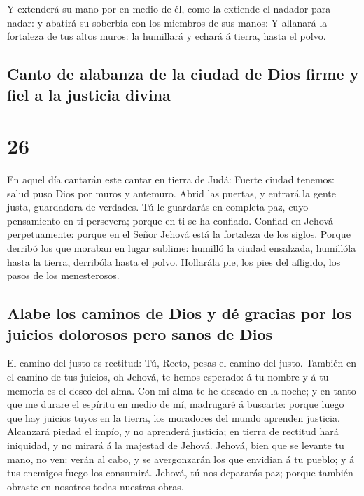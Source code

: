  Y extenderá su mano por en medio de él, como la extiende
el nadador para nadar: y abatirá su soberbia con los miembros de sus
manos:  Y allanará la fortaleza de tus altos muros: la
humillará y echará á tierra, hasta el polvo.

\hypertarget{canto-de-alabanza-de-la-ciudad-de-dios-firme-y-fiel-a-la-justicia-divina}{%
\subsection{Canto de alabanza de la ciudad de Dios firme y fiel a la
justicia
divina}\label{canto-de-alabanza-de-la-ciudad-de-dios-firme-y-fiel-a-la-justicia-divina}}

\hypertarget{section-23-26}{%
\section{26}\label{section-23-26}}

 En aquel día cantarán este cantar en tierra de Judá:
Fuerte ciudad tenemos: salud puso Dios por muros y antemuro.
 Abrid las puertas, y entrará la gente justa, guardadora
de verdades.  Tú le guardarás en completa paz, cuyo
pensamiento en ti persevera; porque en ti se ha confiado. 
Confiad en Jehová perpetuamente: porque en el Señor Jehová está la
fortaleza de los siglos.  Porque derribó los que moraban
en lugar sublime: humilló la ciudad ensalzada, humillóla hasta la
tierra, derribóla hasta el polvo.  Hollarála pie, los pies
del afligido, los pasos de los menesterosos.

\hypertarget{alabe-los-caminos-de-dios-y-duxe9-gracias-por-los-juicios-dolorosos-pero-sanos-de-dios}{%
\subsection{Alabe los caminos de Dios y dé gracias por los juicios
dolorosos pero sanos de
Dios}\label{alabe-los-caminos-de-dios-y-duxe9-gracias-por-los-juicios-dolorosos-pero-sanos-de-dios}}

 El camino del justo es rectitud: Tú, Recto, pesas el
camino del justo.  También en el camino de tus juicios, oh
Jehová, te hemos esperado: á tu nombre y á tu memoria es el deseo del
alma.  Con mi alma te he deseado en la noche; y en tanto
que me durare el espíritu en medio de mí, madrugaré á buscarte: porque
luego que hay juicios tuyos en la tierra, los moradores del mundo
aprenden justicia.  Alcanzará piedad el impío, y no
aprenderá justicia; en tierra de rectitud hará iniquidad, y no mirará á
la majestad de Jehová.  Jehová, bien que se levante tu
mano, no ven: verán al cabo, y se avergonzarán los que envidian á tu
pueblo; y á tus enemigos fuego los consumirá.  Jehová, tú
nos depararás paz; porque también obraste en nosotros todas nuestras
obras.

